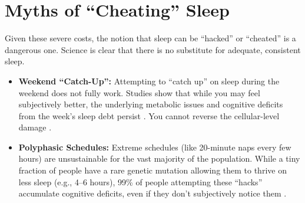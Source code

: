 \section{Myths of ``Cheating'' Sleep}\label{sec:cheating}

Given these severe costs, the notion that sleep can be ``hacked'' or ``cheated'' is a dangerous one. Science is clear that there is no substitute for adequate, consistent sleep.

\begin{itemize}
    \item \textbf{Weekend ``Catch-Up'':} Attempting to ``catch up'' on sleep during the weekend does not fully work. Studies show that while you may feel subjectively better, the underlying metabolic issues and cognitive deficits from the week's sleep debt persist \citep{pejtersen2021catchup}. You cannot reverse the cellular-level damage \citep{weafer2009napping}.
    \item \textbf{Polyphasic Schedules:} Extreme schedules (like 20-minute naps every few hours) are unsustainable for the vast majority of the population. While a tiny fraction of people have a rare genetic mutation allowing them to thrive on less sleep (e.g., 4--6 hours), 99\% of people attempting these ``hacks'' accumulate cognitive deficits, even if they don't subjectively notice them \citep{weafer2009napping}.
\end{itemize}